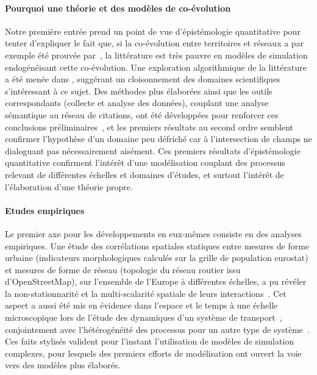 \paragraph{Pourquoi une théorie et des modèles de co-évolution}


Notre première entrée prend un point de vue d'épistémologie quantitative pour tenter d'expliquer le fait que, si la co-évolution entre territoires et réseaux a par exemple été prouvée par~\cite{bretagnolle:tel-00459720}, la littérature est très pauvre en modèles de simulation endogénéisant cette co-évolution. Une exploration algorithmique de la littérature a été menée dans \cite{raimbault2015models}, suggérant un cloisonnement des domaines scientifiques s'intéressant à ce sujet. Des méthodes plus élaborées ainsi que les outils correspondants (collecte et analyse des données), couplant une analyse sémantique au réseau de citations, ont été développées pour renforcer ces conclusions préliminaires~\cite{raimbault2016indirect}, et les premiers résultats au second ordre semblent confirmer l'hypothèse d'un domaine peu défriché car à l'intersection de champs ne dialoguant pas nécessairement aisément. Ces premiers résultats d'épistémologie quantitative confirment l'intérêt d'une modélisation couplant des processus relevant de différentes échelles et domaines d'études, et surtout l'intérêt de l'élaboration d'une théorie propre.


\paragraph{Etudes empiriques}

Le premier axe pour les développements en eux-mêmes consiste en des analyses empiriques. Une étude des corrélations spatiales statiques entre mesures de forme urbaine (indicateurs morphologiques calculés sur la grille de population eurostat) et mesures de forme de réseau (topologie du réseau routier issu d'OpenStreetMap), sur l'ensemble de l'Europe à différentes échelles, a pu révéler la non-stationnarité et la multi-scalarité spatiale de leurs interactions~\cite{raimbault2016cautious}. Cet aspect a aussi été mis en évidence dans l'espace et le temps à une échelle microscopique lors de l'étude des dynamiques d'un système de transport~\cite{raimbault2016investigating}, conjointement avec l'hétérogénéité des processus pour un autre type de système~\cite{raimbault2015hybrid}. Ces faits stylisés valident pour l'instant l'utilisation de modèles de simulation complexes, pour lesquels des premiers efforts de modélisation ont ouvert la voie vers des modèles plus élaborés.


